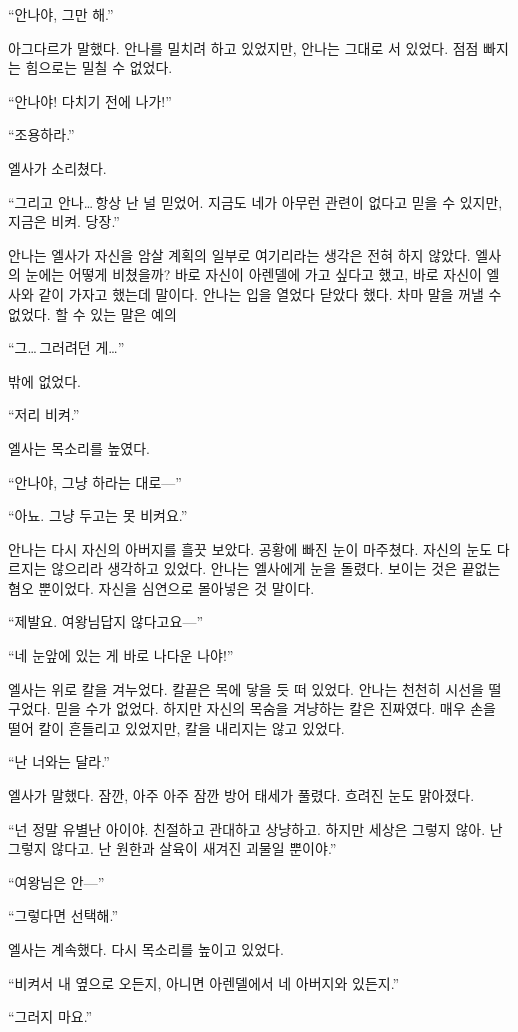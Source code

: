 ``안나야, 그만 해.''

아그다르가 말했다. 안나를 밀치려 하고 있었지만, 안나는 그대로 서 있었다. 점점 빠지는 힘으로는 밀칠 수 없었다.

``안나야! 다치기 전에 나가!''

``조용하라.''

엘사가 소리쳤다.

``그리고 안나\ldots\,항상 난 널 믿었어. 지금도 네가 아무런 관련이 없다고 믿을 수 있지만, 지금은 비켜. 당장.''

안나는 엘사가 자신을 암살 계획의 일부로 여기리라는 생각은 전혀 하지 않았다. 엘사의 눈에는 어떻게 비쳤을까? 바로 자신이 아렌델에 가고 싶다고 했고, 바로 자신이 엘사와 같이 가자고 했는데 말이다. 안나는 입을 열었다 닫았다 했다. 차마 말을 꺼낼 수 없었다. 할 수 있는 말은 예의

``그\ldots\,그러려던 게\ldots''

밖에 없었다.

``저리 비켜.''

엘사는 목소리를 높였다.

``안나야, 그냥 하라는 대로—''

``아뇨. 그냥 두고는 못 비켜요.''

안나는 다시 자신의 아버지를 흘끗 보았다. 공황에 빠진 눈이 마주쳤다. 자신의 눈도 다르지는 않으리라 생각하고 있었다. 안나는 엘사에게 눈을 돌렸다. 보이는 것은 끝없는 혐오 뿐이었다. 자신을 심연으로 몰아넣은 것 말이다.

``제발요. 여왕님답지 않다고요—''

``네 눈앞에 있는 게 바로 나다운 나야!''

엘사는 위로 칼을 겨누었다. 칼끝은 목에 닿을 듯 떠 있었다. 안나는 천천히 시선을 떨구었다. 믿을 수가 없었다. 하지만 자신의 목숨을 겨냥하는 칼은 진짜였다. 매우 손을 떨어 칼이 흔들리고 있었지만, 칼을 내리지는 않고 있었다.

``난 너와는 달라.''

엘사가 말했다. 잠깐, 아주 아주 잠깐 방어 태세가 풀렸다. 흐려진 눈도 맑아졌다.

``넌 정말 유별난 아이야. 친절하고 관대하고 상냥하고. 하지만 세상은 그렇지 않아. 난 그렇지 않다고. 난 원한과 살육이 새겨진 괴물일 뿐이야.''

``여왕님은 안—''

``그렇다면 선택해.''

엘사는 계속했다. 다시 목소리를 높이고 있었다.

``비켜서 내 옆으로 오든지, 아니면 아렌델에서 네 아버지와 있든지.''

``그러지 마요.''

